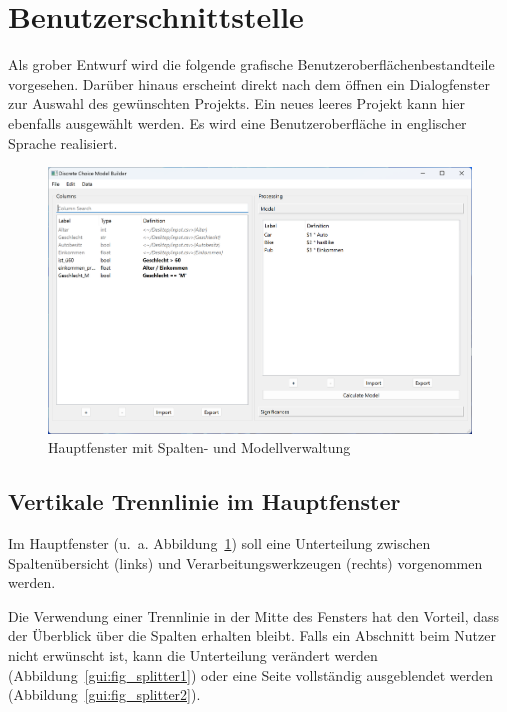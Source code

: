 \documentclass{article}
\begin{document}
\clearpage
\section{Benutzerschnittstelle}

Als grober Entwurf wird die folgende grafische Benutzeroberflächenbestandteile vorgesehen. Darüber hinaus erscheint direkt nach dem öffnen ein Dialogfenster zur Auswahl des gewünschten Projekts. Ein neues leeres Projekt kann hier ebenfalls ausgewählt werden. Es wird eine Benutzeroberfläche in englischer Sprache realisiert.\\

\begin{figure}[H]%
  \centering
  \includegraphics[width=12cm]{specifications/img/gui-screenshots/columns+model.png}
  \caption{Hauptfenster mit Spalten- und Modellverwaltung}
  \label{gui:fig_columns+model}
\end{figure}

\subsection{Vertikale Trennlinie im Hauptfenster}

Im Hauptfenster (u.~a. Abbildung~\ref{gui:fig_columns+model}) soll eine Unterteilung zwischen Spaltenübersicht (links) und Verarbeitungswerkzeugen (rechts) vorgenommen werden. 

Die Verwendung einer Trennlinie in der Mitte des Fensters hat den Vorteil, dass der Überblick über die Spalten erhalten bleibt. Falls ein Abschnitt beim Nutzer nicht erwünscht ist, kann die Unterteilung verändert werden (Abbildung~\ref{gui:fig_splitter1}) oder eine Seite vollständig ausgeblendet werden (Abbildung~\ref{gui:fig_splitter2}).
\end{document}
